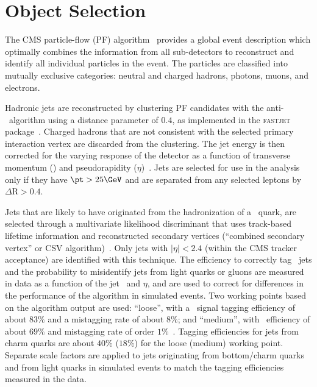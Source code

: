 \section{Object Selection}\label{sec:objects}
The CMS particle-flow (PF) algorithm~\cite{CMS-PAS-PFT-09-001} provides a global event description which optimally combines the information from all sub-detectors to reconstruct and identify all individual particles in the event.
The particles are classified into mutually exclusive categories: neutral and charged hadrons, photons, muons, and electrons.

Hadronic jets are reconstructed by clustering PF candidates with the anti-\kt\ algorithm using a distance parameter of $0.4$, as implemented in the \textsc{fastjet} package~\cite{Cacciari:fastjet1,Cacciari:fastjet2}.
Charged hadrons that are not consistent with the selected primary interaction vertex are discarded from the clustering.
The jet energy is then corrected for the varying response of the detector as a function of transverse momentum (\pt) and pseudorapidity ($\eta$)~\cite{cmsJEC}. %
Jets are selected for use in the analysis only if they have $\pt>25\GeV$ and are separated from any selected leptons by $\Delta\mathrm{R}>0.4$.

Jets that are likely to have originated from the hadronization of a \cPqb\ quark, are selected through a multivariate likelihood discriminant that uses track-based lifetime information and reconstructed secondary vertices (``combined secondary vertex'' or CSV algorithm)~\cite{Chatrchyan:2012jua}.
Only jets with $|\eta| < 2.4$ (within the CMS tracker acceptance) are identified with this technique.
The efficiency to correctly tag \cPqb\ jets and the probability to misidentify jets from light quarks or gluons are measured in data as a function of the jet \pt\ and $\eta$, and are used to correct for differences in the performance of the algorithm in simulated events.
Two working points based on the algorithm output are used: ``loose'', with a \cPqb\ signal tagging efficiency of about $83\%$ and a mistagging rate of about $8\%$; and ``medium'', with \cPqb\ efficiency of about $69\%$ and mistagging rate of order $1\%$~\cite{BTV-15-001}.
Tagging efficiencies for jets from charm quarks are about $40\%$ ($18\%$) for the loose (medium) working point.  Separate scale factors are applied to jets originating from bottom/charm quarks and from light quarks in simulated events to match the tagging efficiencies measured in the data.


